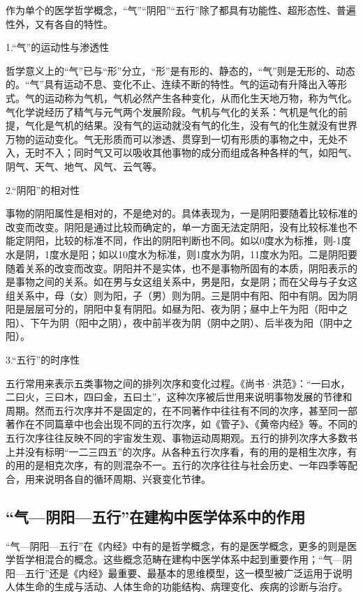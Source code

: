 \documentclass[draft,12pt]{ctexbook}
\begin{document}
作为单个的医学哲学概念，“气”“阴阳”“五行”除了都具有功能性、超形态性、普遍性外，又有各自的特性。

1.“气”的运动性与渗透性

哲学意义上的“气”已与“形”分立，“形”是有形的、静态的，“气”则是无形的、动态的。“气”具有运动不息、变化不止、连续不断的特性。气的运动有升降出入等形式。气的运动称为气机，气机必然产生各种变化，从而化生天地万物，称为气化。气化学说经历了精气与元气两个发展阶段。气机与气化的关系：气机是气化的前提，气化是气机的结果。没有气的运动就没有气的化生，没有气的化生就没有世界万物的运动变化。气无形质而可以渗透、贯穿到一切有形质的事物之中，无处不入，无时不入；同时气又可以吸收其他事物的成分而组成各种各样的气，如阳气、阴气、天气、地气、风气、云气等。

2.“阴阳”的相对性

事物的阴阳属性是相对的，不是绝对的。具体表现为，一是阴阳要随着比较标准的改变而改变。阴阳是通过比较而确定的，单一方面无法定阴阳，没有比较标准也不能定阴阳，比较的标准不同，作出的阴阳判断也不同。如以0度水为标推，则-1度水是阴，1度水是阳；如以10度水为标准，则1度水为阴，11度水为阳。二是阴阳要随着关系的改变而改变。阴阳并不是实体，也不是事物所固有的本质，阴阳表示的是事物之间的关系。如在男与女这组关系中，男是阳，女是阴；而在父母与子女这组关系中，母（女）则为阳，子（男）则为阴。三是阴中有阳、阳中有阴。因为阴阳是层层可分的，阴阳中复有阴阳。如昼为阳、夜为阴；昼中上午为阳（阳中之阳）、下午为阴（阳中之阴），夜中前半夜为阴（阴中之阴）、后半夜为阳（阴中之阳）。

3.“五行”的时序性

五行常用来表示五类事物之间的排列次序和变化过程。《尚书·洪范》：“一曰水，二曰火，三曰木，四曰金，五曰土”，这种次序被后世用来说明事物发展的节律和周期。然而五行次序并不是固定的，在不同著作中往往有不同的次序，甚至同一部著作在不同篇章中也会出现不同的五行次序，如《管子》、《黄帝内经》等。不同的五行次序往往反映不同的宇宙发生观、事物运动周期观。五行的排列次序大多数书上并没有标明“一二三四五”的次序。从各种五行次序看，有的用的是相生次序，有的用的是相克次序，有的则混杂不一。五行的次序往往与社会历史、一年四季等配合，用来说明各自的循环周期、兴衰变化节律。

\subsection{“气—阴阳—五行”在建构中医学体系中的作用}%

“气—阴阳—五行”在《内经》中有的是哲学概念，有的是医学概念，更多的则是医学哲学相混合的概念。这些概念范畴在建构中医学体系中起到重要作用；“气—阴阳—五行”还是《内经》最重要、最基本的思维模型，这一模型被广泛运用于说明人体生命的生成与活动、人体生命的功能结构、病理变化、疾病的诊断与治疗。
\end{document}
